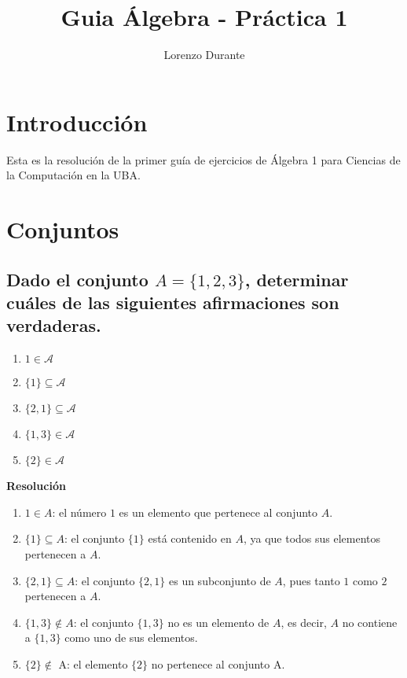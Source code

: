 \documentclass{article}
\title{Guia Álgebra - Práctica 1}
\author{Lorenzo Durante}
\begin{document}
\maketitle

\section{Introducción}
{Esta es la resolución de la primer guía de ejercicios de Álgebra 1 para Ciencias de la Computación en la UBA.}

\section{Conjuntos}
\subsection{Dado el conjunto \texorpdfstring{$A = \{ 1, 2, 3\}$}{A = {1, 2, 3}}, determinar cuáles de las siguientes afirmaciones son verdaderas.}

\begin{enumerate}[label=\roman*)]
    \item $1 \in \mathcal{A}$
    \item $\{1\} \subseteq \mathcal{A}$
    \item $\{2,1\} \subseteq \mathcal{A}$
    \item $\{1,3\} \in \mathcal{A}$
    \item $\{2\} \in \mathcal{A}$
\end{enumerate}
\textbf{Resolución}
\begin{enumerate}[label=\roman*)]
    \item $1 \in A$: el número $1$ es un elemento que pertenece al conjunto $A$.
    
    \item $\{1\} \subseteq A$: el conjunto $\{1\}$ está contenido en $A$, ya que todos sus elementos pertenecen a $A$.
    
    \item $\{2,1\} \subseteq A$: el conjunto $\{2,1\}$ es un subconjunto de $A$, pues tanto $1$ como $2$ pertenecen a $A$.
    
    \item $\{1,3\} \notin A$: el conjunto $\{1,3\}$ no es un elemento de $A$, es decir, $A$ no contiene a $\{1,3\}$ como uno de sus elementos.
    \item $\{2\} \notin$ A: el elemento $\{2\}$ no pertenece al conjunto A. 
\end{enumerate}
\end{document}
